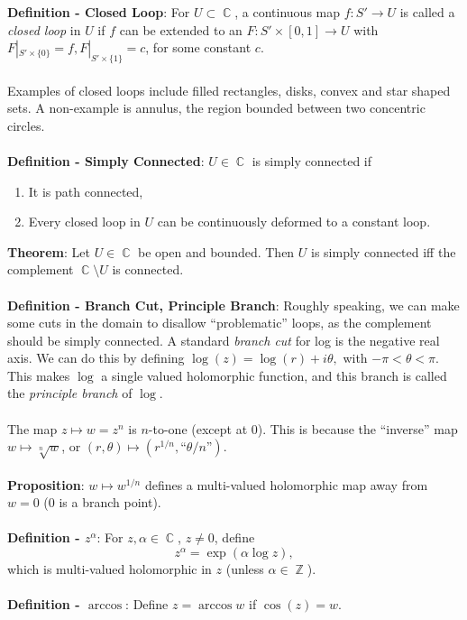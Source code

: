 \documentclass{article}
\DeclareMathOperator{\Z}{\mathbb{Z}}
\DeclareMathOperator{\C}{\mathbb{C}}
\begin{document}
\textbf{Definition - Closed Loop}: For $U \subset \C$, a continuous map $f: S' \rightarrow U$ is called a \textit{closed loop} in $U$ if $f$ can be extended to an $F: S' \times [0, 1] \rightarrow U$ with $F|_{S' \times \{0\}} = f, F|_{S' \times \{1\}} = c$, for some constant $c$. \\ \\
Examples of closed loops include filled rectangles, disks, convex and star shaped sets. A non-example is annulus, the region bounded between two concentric circles. \\ \\
\textbf{Definition - Simply Connected}: $U \in \C$ is simply connected if \begin{enumerate}
    \item It is path connected,
    \item Every closed loop in $U$ can be continuously deformed to a constant loop.
\end{enumerate} $ $ \\
\textbf{Theorem}: Let $U \in \C$ be open and bounded. Then $U$ is simply connected iff the complement $\C \setminus U$ is connected. \\ \\
\textbf{Definition - Branch Cut, Principle Branch}: Roughly speaking, we can make some cuts in the domain to disallow ``problematic'' loops, as the complement should be simply connected. A standard \textit{branch cut} for log is the negative real axis. We can do this by defining $\log(z) = \log(r) + i\theta,$ with $-\pi < \theta < \pi.$ This makes $\log$ a single valued holomorphic function, and this branch is called the \textit{principle branch} of $\log$. \\ \\
The map $z \mapsto w = z^n$ is $n$-to-one (except at 0). This is because the ``inverse'' map $w \mapsto \sqrt[n]{w}$, or $(r, \theta) \mapsto (r^{1/n}, \text{``}\theta/n\text{''})$. \\ \\
\textbf{Proposition}: $w \mapsto w^{1/n}$ defines a multi-valued holomorphic map away from $w = 0$ (0 is a branch point). \\ \\
\textbf{Definition - $z^\alpha$}: For $z, \alpha \in \C$, $z \neq 0$, define $$z^\alpha = \exp(\alpha \log z),$$ which is multi-valued holomorphic in $z$ (unless $\alpha \in \Z$). \\ \\
\textbf{Definition - $\arccos$}: Define $z = \arccos{w}$ if $\cos(z) = w.$ \\ \\
\end{document}
